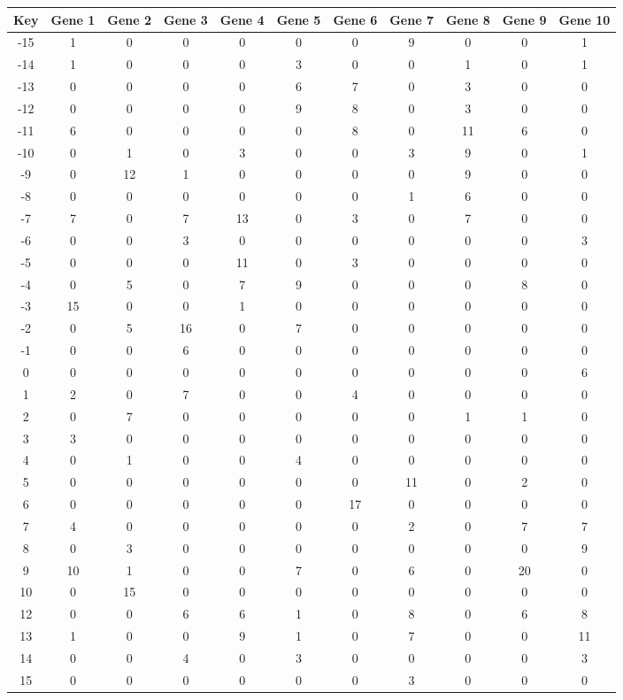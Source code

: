 \begin{tabular}{|c|c|c|c|c|c|c|c|c|c|c|}
\hline
Key & Gene 1 & Gene 2 & Gene 3 & Gene 4 & Gene 5 & Gene 6 & Gene 7 & Gene 8 & Gene 9 & Gene 10 \\
\hline
-15 & 1 & 0 & 0 & 0 & 0 & 0 & 9 & 0 & 0 & 1 \\
-14 & 1 & 0 & 0 & 0 & 3 & 0 & 0 & 1 & 0 & 1 \\
-13 & 0 & 0 & 0 & 0 & 6 & 7 & 0 & 3 & 0 & 0 \\
-12 & 0 & 0 & 0 & 0 & 9 & 8 & 0 & 3 & 0 & 0 \\
-11 & 6 & 0 & 0 & 0 & 0 & 8 & 0 & 11 & 6 & 0 \\
-10 & 0 & 1 & 0 & 3 & 0 & 0 & 3 & 9 & 0 & 1 \\
-9 & 0 & 12 & 1 & 0 & 0 & 0 & 0 & 9 & 0 & 0 \\
-8 & 0 & 0 & 0 & 0 & 0 & 0 & 1 & 6 & 0 & 0 \\
-7 & 7 & 0 & 7 & 13 & 0 & 3 & 0 & 7 & 0 & 0 \\
-6 & 0 & 0 & 3 & 0 & 0 & 0 & 0 & 0 & 0 & 3 \\
-5 & 0 & 0 & 0 & 11 & 0 & 3 & 0 & 0 & 0 & 0 \\
-4 & 0 & 5 & 0 & 7 & 9 & 0 & 0 & 0 & 8 & 0 \\
-3 & 15 & 0 & 0 & 1 & 0 & 0 & 0 & 0 & 0 & 0 \\
-2 & 0 & 5 & 16 & 0 & 7 & 0 & 0 & 0 & 0 & 0 \\
-1 & 0 & 0 & 6 & 0 & 0 & 0 & 0 & 0 & 0 & 0 \\
0 & 0 & 0 & 0 & 0 & 0 & 0 & 0 & 0 & 0 & 6 \\
1 & 2 & 0 & 7 & 0 & 0 & 4 & 0 & 0 & 0 & 0 \\
2 & 0 & 7 & 0 & 0 & 0 & 0 & 0 & 1 & 1 & 0 \\
3 & 3 & 0 & 0 & 0 & 0 & 0 & 0 & 0 & 0 & 0 \\
4 & 0 & 1 & 0 & 0 & 4 & 0 & 0 & 0 & 0 & 0 \\
5 & 0 & 0 & 0 & 0 & 0 & 0 & 11 & 0 & 2 & 0 \\
6 & 0 & 0 & 0 & 0 & 0 & 17 & 0 & 0 & 0 & 0 \\
7 & 4 & 0 & 0 & 0 & 0 & 0 & 2 & 0 & 7 & 7 \\
8 & 0 & 3 & 0 & 0 & 0 & 0 & 0 & 0 & 0 & 9 \\
9 & 10 & 1 & 0 & 0 & 7 & 0 & 6 & 0 & 20 & 0 \\
10 & 0 & 15 & 0 & 0 & 0 & 0 & 0 & 0 & 0 & 0 \\
12 & 0 & 0 & 6 & 6 & 1 & 0 & 8 & 0 & 6 & 8 \\
13 & 1 & 0 & 0 & 9 & 1 & 0 & 7 & 0 & 0 & 11 \\
14 & 0 & 0 & 4 & 0 & 3 & 0 & 0 & 0 & 0 & 3 \\
15 & 0 & 0 & 0 & 0 & 0 & 0 & 3 & 0 & 0 & 0 \\
\hline
\end{tabular}
